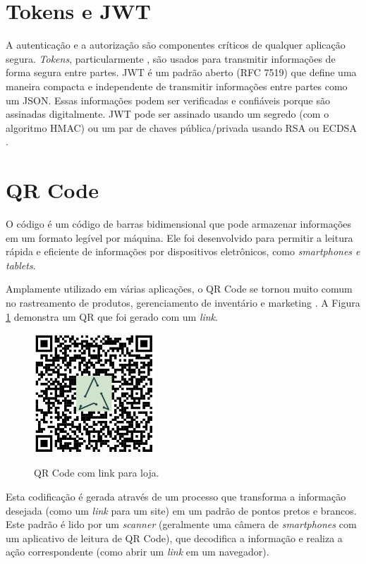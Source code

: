 \section{Tokens e JWT}

A autenticação e a autorização são componentes críticos de qualquer aplicação segura. \textit{Tokens}, particularmente , são usados para transmitir informações de forma segura entre partes. \gls{JWT} é um padrão aberto (RFC 7519) que define uma maneira compacta e independente de transmitir informações entre partes como um \gls{JSON}. Essas informações podem ser verificadas e confiáveis porque são assinadas digitalmente. JWT pode ser assinado usando um segredo (com o algoritmo HMAC) ou um par de chaves pública/privada usando RSA ou ECDSA \cite{JWT2023}.

\section{QR Code}

O código  é um código de barras bidimensional que pode armazenar informações em um formato legível por máquina. Ele foi desenvolvido para permitir a leitura rápida e eficiente de informações por dispositivos eletrônicos, como \textit{smartphones e tablets}.

Amplamente utilizado em várias aplicações, o QR Code se tornou muito comum no rastreamento de produtos, gerenciamento de inventário e marketing \cite{QRCode2023}. A Figura \ref{fig:qr} demonstra um QR que foi gerado com um \textit{link}.

\begin{figure}[h]
\centering
\caption{QR Code com link para loja.}
\includegraphics[width=0.4\textwidth]{figuras/qr.png}
\label{fig:qr}
\end{figure}

Esta codificação é gerada através de um processo que transforma a informação desejada (como um \textit{link} para um site) em um padrão de pontos pretos e brancos. Este padrão é lido por um \textit{scanner} (geralmente uma câmera de \textit{smartphones} com um aplicativo de leitura de QR Code), que decodifica a informação e realiza a ação correspondente (como abrir um \textit{link} em um navegador).

